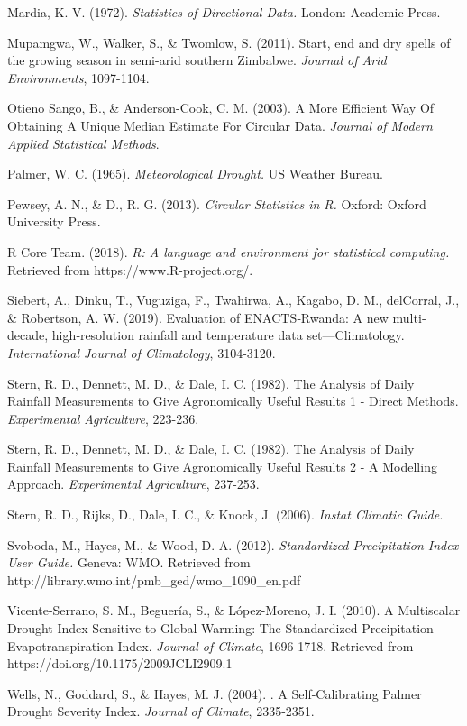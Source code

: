\documentclass[
  letterpaper,
  DIV=11,
  numbers=noendperiod]{scrreprt}
\begin{document}
Mardia, K. V. (1972). \emph{Statistics of Directional Data.} London:
Academic Press.

Mupamgwa, W., Walker, S., \& Twomlow, S. (2011). Start, end and dry
spells of the growing season in semi-arid southern Zimbabwe.
\emph{Journal of Arid Environments}, 1097-1104.

Otieno Sango, B., \& Anderson-Cook, C. M. (2003). A More Efficient Way
Of Obtaining A Unique Median Estimate For Circular Data. \emph{Journal
of Modern Applied Statistical Methods}.

Palmer, W. C. (1965). \emph{Meteorological Drought.} US Weather Bureau.

Pewsey, A. N., \& D., R. G. (2013). \emph{Circular Statistics in R.}
Oxford: Oxford University Press.

R Core Team. (2018). \emph{R: A language and environment for statistical
computing.} Retrieved from https://www.R-project.org/.

Siebert, A., Dinku, T., Vuguziga, F., Twahirwa, A., Kagabo, D. M.,
delCorral, J., \& Robertson, A. W. (2019). Evaluation of ENACTS‐Rwanda:
A new multi‐decade, high‐resolution rainfall and temperature data
set---Climatology. \emph{International Journal of Climatology},
3104-3120.

Stern, R. D., Dennett, M. D., \& Dale, I. C. (1982). The Analysis of
Daily Rainfall Measurements to Give Agronomically Useful Results 1 -
Direct Methods. \emph{Experimental Agriculture}, 223-236.

Stern, R. D., Dennett, M. D., \& Dale, I. C. (1982). The Analysis of
Daily Rainfall Measurements to Give Agronomically Useful Results 2 - A
Modelling Approach. \emph{Experimental Agriculture}, 237-253.

Stern, R. D., Rijks, D., Dale, I. C., \& Knock, J. (2006). \emph{Instat
Climatic Guide.}

Svoboda, M., Hayes, M., \& Wood, D. A. (2012). \emph{Standardized
Precipitation Index User Guide.} Geneva: WMO. Retrieved from
http://library.wmo.int/pmb\_ged/wmo\_1090\_en.pdf

Vicente-Serrano, S. M., Beguería, S., \& López-Moreno, J. I. (2010). A
Multiscalar Drought Index Sensitive to Global Warming: The Standardized
Precipitation Evapotranspiration Index. \emph{Journal of Climate},
1696-1718. Retrieved from https://doi.org/10.1175/2009JCLI2909.1

Wells, N., Goddard, S., \& Hayes, M. J. (2004). . A Self-Calibrating
Palmer Drought Severity Index. \emph{Journal of Climate}, 2335-2351.
\end{document}

